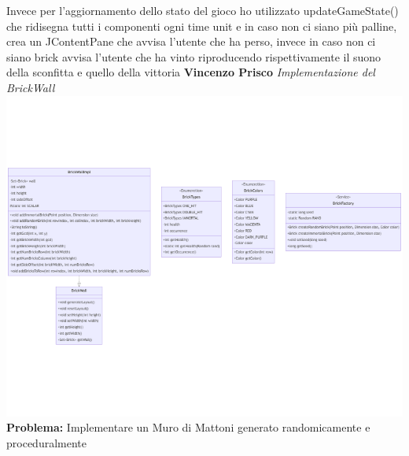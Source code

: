 \documentclass[a4paper,12pt]{report}
\begin{document}
Invece per l'aggiornamento dello stato del gioco ho utilizzato updateGameState() che ridisegna tutti i componenti ogni time unit e in caso non ci siano più palline, crea un JContentPane che avvisa l'utente che ha perso, invece in caso non ci siano brick avvisa l'utente che ha vinto riproducendo rispettivamente il suono della sconfitta e quello della vittoria
\newline
\newline
\newline
\textbf{Vincenzo Prisco}
\newline
\newline
\textit{Implementazione del BrickWall}
\newline
\includegraphics[width=\textwidth]{bricks.png}
\newline
\textbf{Problema:} Implementare un Muro di Mattoni generato randomicamente e proceduralmente
\newline
\end{document}

